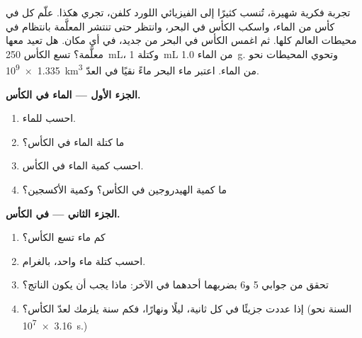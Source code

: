 \begin{problem}
\label{pb:g10:the-mole:1}
تجربة فكرية شهيرة، تُنسب كثيرًا إلى الفيزيائي اللورد كلفن، تجري هكذا. علّم كل
 في كأس من الماء، واسكب الكأس في البحر، وانتظر حتى تنتشر 
المعلَّمة بانتظام في محيطات العالم كلها. ثم اغمس الكأس في البحر من جديد، في
أي مكان. هل تعيد معها  معلَّمة؟ تسع الكأس
\qty{250}{mL}، وكتلة \qty{1}{mL} من الماء \qty{1.0}{g}. وتحوي
المحيطات نحو \qty{1.335e9}{km^3} من الماء. اعتبر ماء البحر ماءً نقيًا
في العدّ.

\medskip
\noindent\textbf{الجزء الأول --- الماء في الكأس.}
\begin{enumerate}
  \item احسب  للماء.
  \item ما كتلة الماء في الكأس؟
  \item احسب كمية  الماء في الكأس.
  \item ما كمية  الهيدروجين في الكأس؟ وكمية 
        الأكسجين؟
\end{enumerate}

\medskip
\noindent\textbf{الجزء الثاني ---  في الكأس.}
\begin{enumerate}[resume]
  \item كم  ماء تسع الكأس؟
  \item احسب كتلة  ماء واحد، بالغرام.
  \item تحقق من جوابي 5 و6 بضربهما أحدهما في الآخر: ماذا يجب أن يكون
        الناتج؟
  \item إذا عددت جزيئًا في كل ثانية، ليلًا ونهارًا، فكم سنة يلزمك لعدّ 
        الكأس؟ (السنة نحو \qty{3.16e7}{s}.)
\end{enumerate}


\end{problem}
